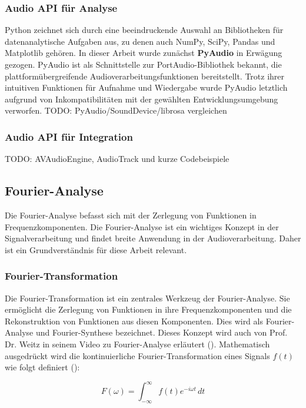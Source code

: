 \documentclass[11pt,a4paper]{article}
\begin{document}
\subsubsection{Audio API für Analyse}
Python zeichnet sich durch eine beeindruckende Auswahl an Bibliotheken für datenanalytische Aufgaben 
aus, zu denen auch NumPy, SciPy, Pandas und Matplotlib gehören. In dieser Arbeit wurde zunächst 
\textbf{PyAudio} in Erwägung gezogen. PyAudio ist als Schnittstelle zur PortAudio-Bibliothek 
bekannt, die plattformübergreifende Audioverarbeitungsfunktionen bereitstellt. Trotz ihrer 
intuitiven Funktionen für Aufnahme und Wiedergabe wurde PyAudio letztlich aufgrund von 
Inkompatibilitäten mit der gewählten Entwicklungsumgebung verworfen.
TODO: PyAudio/SoundDevice/librosa vergleichen

\subsubsection{Audio API für Integration}
TODO: AVAudioEngine, AudioTrack und kurze Codebeispiele

\newpage \subsection{Fourier-Analyse}
Die Fourier-Analyse befasst sich mit der Zerlegung von Funktionen in Frequenzkomponenten. Die
Fourier-Analyse ist ein wichtiges Konzept in der Signalverarbeitung und findet breite Anwendung
in der Audioverarbeitung. Daher ist ein Grundverständnis für diese Arbeit relevant.

\subsubsection{Fourier-Transformation}
Die Fourier-Transformation ist ein zentrales Werkzeug der Fourier-Analyse. Sie ermöglicht die
Zerlegung von Funktionen in ihre Frequenzkomponenten und die Rekonstruktion von Funktionen aus
diesen Komponenten. Dies wird als Fourier-Analyse und Fourier-Synthese bezeichnet. Dieses Konzept
wird auch von Prof. Dr. Weitz in seinem Video zu Fourier-Analyse erläutert
(\cite[2:20]{weitz2023fourier}). Mathematisch ausgedrückt wird die kontinuierliche
Fourier-Transformation eines Signals \( f(t) \) wie folgt definiert
(\cite[Chapter~5]{hansen2014fourier}):

\begin{equation*}
	F(\omega) = \int_{-\infty}^{\infty} f(t) e^{-i \omega t} \, dt
	\label{eq:fourier_transform}
\end{equation*}
\end{document}

